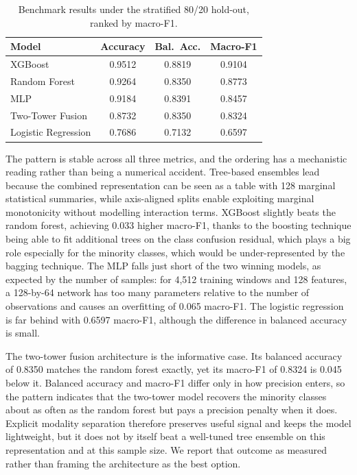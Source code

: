 \documentclass[a4paper,twoside]{article}
\begin{document}
\begin{table}[!ht]
    \caption{Benchmark results under the stratified 80/20 hold-out, ranked by macro-F1.}\label{tab:results}
    \centering
    \setlength{\tabcolsep}{3.5pt}
    \footnotesize
    \begin{tabular}{lccc}
        \toprule
        Model               & Accuracy & Bal.~Acc. & Macro-F1 \\
        \midrule
        \acs{XGBoost}       & 0.9512   & 0.8819    & 0.9104   \\
        Random Forest       & 0.9264   & 0.8350    & 0.8773   \\
        \acs{MLP}           & 0.9184   & 0.8391    & 0.8457   \\
        Two-Tower Fusion    & 0.8732   & 0.8350    & 0.8324   \\
        Logistic Regression & 0.7686   & 0.7132    & 0.6597   \\
        \bottomrule
    \end{tabular}
\end{table}

The pattern is stable across all three metrics, and the ordering has a mechanistic reading rather than being a numerical accident. Tree-based ensembles lead because the combined representation can be seen as a table with 128 marginal statistical summaries, while axis-aligned splits enable exploiting marginal monotonicity without modelling interaction terms. \ac{XGBoost} slightly beats the random forest, achieving 0.033 higher macro-F1, thanks to the boosting technique being able to fit additional trees on the class confusion residual, which plays a big role especially for the minority classes, which would be under-represented by the bagging technique. The \ac{MLP} falls just short of the two winning models, as expected by the number of samples: for 4,512 training windows and 128 features, a 128-by-64 network has too many parameters relative to the number of observations and causes an overfitting of 0.065 macro-F1. The logistic regression is far behind with 0.6597 macro-F1, although the difference in balanced accuracy is small.

The two-tower fusion architecture is the informative case. Its balanced accuracy of 0.8350 matches the random forest exactly, yet its macro-F1 of 0.8324 is 0.045 below it. Balanced accuracy and macro-F1 differ only in how precision enters, so the pattern indicates that the two-tower model recovers the minority classes about as often as the random forest but pays a precision penalty when it does. Explicit modality separation therefore preserves useful signal and keeps the model lightweight, but it does not by itself beat a well-tuned tree ensemble on this representation and at this sample size. We report that outcome as measured rather than framing the architecture as the best option.
\end{document}
